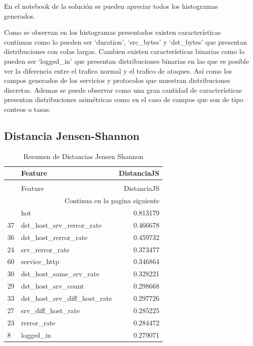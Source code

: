 \documentclass[12pt,a4paper]{article}
\begin{document}
En el notebook de la solución se pueden apreciar todos los histogramas generados.

Como se observan en los histogramas presentados existen características continuas como lo pueden ser
`duration', `src_bytes' y `dst_bytes' que presentan distribuciones con colas largas.
Cambien existen características
binarias como lo pueden ser `logged_in' que presentan distribuciones binarias en las que es posible ver
la diferencia entre el trafico normal y el trafico de ataques.
Así como los campos generados
de los servicios y protocolos que muestran distribuciones discretas.
Ademas se puede observar como
una gran cantidad de características presentan distribuciones asimétricas como en el caso de campos que son de tipo conteos o tasas.

\subsection{Distancia Jensen-Shannon}\label{subsec:distancia-jensen-shannon}

\begin{longtable}{llr}
  \caption{Resumen de Distancias Jensen Shannon} \\
  \toprule
  & Feature & DistanciaJS \\
  \midrule
  \endfirsthead
  \caption[]{Resumen de Distancias Jensen Shannon} \\
  \toprule
  & Feature & DistanciaJS \\
  \midrule
  \endhead
  \midrule
  \multicolumn{3}{r}{Continua en la pagina siguiente} \\
  \midrule
  \endfoot
  \bottomrule
  \endlastfoot
  6 & hot & 0.813179 \\
  37 & dst_host_srv_rerror_rate & 0.466678 \\
  36 & dst_host_rerror_rate & 0.459732 \\
  24 & srv_rerror_rate & 0.373477 \\
  60 & service_http & 0.346864 \\
  30 & dst_host_same_srv_rate & 0.328221 \\
  29 & dst_host_srv_count & 0.298668 \\
  33 & dst_host_srv_diff_host_rate & 0.297726 \\
  27 & srv_diff_host_rate & 0.285225 \\
  23 & rerror_rate & 0.284472 \\
  8 & logged_in & 0.279071 \\
\end{longtable}
\end{document}
